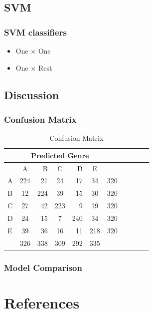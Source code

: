 \documentclass{beamer}
\begin{document}
\subsection{SVM}
\begin{frame}
\frametitle{SVM classifiers}
\begin{itemize}
  \item One $\times$ One
  \item One $\times$ Rest
\end{itemize}
\end{frame}

\subsection{Discussion}

\begin{frame}
\frametitle{Confusion Matrix}
\centering

\begin{table}[H]
\begin{center}
\caption{Confusion Matrix}
\begin{tabular}{|l|*5{c|r|}}
\hline
 & \multicolumn{5}{c|}{Predicted Genre} & \\ \hline
 & A  & B  & C  & D  & E  &     \\ \hline
A& 224& 21 & 24 & 17 & 34 & 320 \\ \hline
B& 12 & 224& 39 & 15 & 30 & 320 \\ \hline
C& 27 & 42 & 223&  9 & 19 & 320 \\ \hline
D& 24 & 15 & 7  &240 & 34 & 320 \\ \hline
E& 39 & 36 & 16 & 11 & 218& 320 \\ \hline
 & 326 &338 & 309 & 292 & 335 & \\ \hline
\end{tabular}
\end{center}
\end{table}
\end{frame}

\begin{frame}
\frametitle{Model Comparison}
\centering
{}
\end{frame}

\section{References}

%
%
\end{document}

